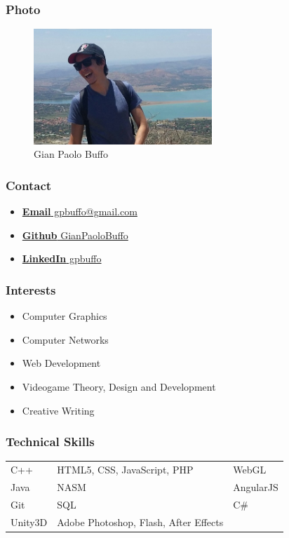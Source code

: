 \documentclass{article}
\begin{document}
	\subsubsection{Photo}
		\begin{figure}[H]
			\centering
			\includegraphics[width=0.6\textwidth]{../gianpaolo.jpg}
			\caption{Gian Paolo Buffo}
		\end{figure}
	\subsubsection{Contact}
		\begin{itemize}
			\item \href{mailto:gpbuffo@gmail.com}
				{\textbf{Email} gpbuffo@gmail.com}
			\item \href{https://github.com/GianPaoloBuffo}
				{\textbf{Github} GianPaoloBuffo}
			\item \href{https://www.linkedin.com/in/gpbuffo}
				{\textbf{LinkedIn} gpbuffo}
		\end{itemize}
	\subsubsection{Interests}
		\begin{itemize}
			\item Computer Graphics
			\item Computer Networks
			\item Web Development
			\item Videogame Theory, Design and Development
			\item Creative Writing
		\end{itemize}
	\subsubsection{Technical Skills}
		\begin{tabular}{| l | l | l |}
			C++		& HTML5, CSS, JavaScript, PHP	& WebGL    	\\
			Java    & NASM     	& AngularJS							\\
			Git 	& SQL     	& C\#									\\
			Unity3D & Adobe Photoshop, Flash, After Effects &                  
		\end{tabular}
\end{document}
